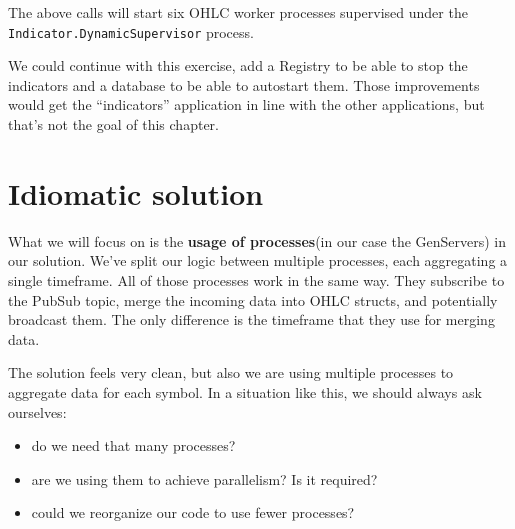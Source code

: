 \documentclass[
  oneside]{book}
\newenvironment{Shaded}{\begin{snugshade}}{\end{snugshade}}
\newcommand{\AttributeTok}[1]{\textcolor[rgb]{0.13,0.29,0.53}{#1}}
\newcommand{\CommentTok}[1]{\textcolor[rgb]{0.56,0.35,0.01}{\textit{#1}}}
\newcommand{\ErrorTok}[1]{\textcolor[rgb]{0.64,0.00,0.00}{\textbf{#1}}}
\newcommand{\ExtensionTok}[1]{#1}
\newcommand{\KeywordTok}[1]{\textcolor[rgb]{0.13,0.29,0.53}{\textbf{#1}}}
\newcommand{\NormalTok}[1]{#1}
\newcommand{\OperatorTok}[1]{\textcolor[rgb]{0.81,0.36,0.00}{\textbf{#1}}}
\newcommand{\StringTok}[1]{\textcolor[rgb]{0.31,0.60,0.02}{#1}}
\providecommand{\tightlist}{%
  \setlength{\itemsep}{0pt}\setlength{\parskip}{0pt}}
\begin{document}
\begin{Shaded}
\end{Shaded}

The above calls will start six OHLC worker processes supervised under the \texttt{Indicator.DynamicSupervisor} process.

We could continue with this exercise, add a Registry to be able to stop the indicators and a database to be able to autostart them. Those improvements would get the ``indicators'' application in line with the other applications, but that's not the goal of this chapter.

\section{Idiomatic solution}\label{idiomatic-solution}

What we will focus on is the \textbf{usage of processes}(in our case the GenServers) in our solution. We've split our logic between multiple processes, each aggregating a single timeframe. All of those processes work in the same way. They subscribe to the PubSub topic, merge the incoming data into OHLC structs, and potentially broadcast them. The only difference is the timeframe that they use for merging data.

The solution feels very clean, but also we are using multiple processes to aggregate data for each symbol. In a situation like this, we should always ask ourselves:

\begin{itemize}
\tightlist
\item
  do we need that many processes?
\item
  are we using them to achieve parallelism? Is it required?
\item
  could we reorganize our code to use fewer processes?
\end{itemize}
\end{document}

